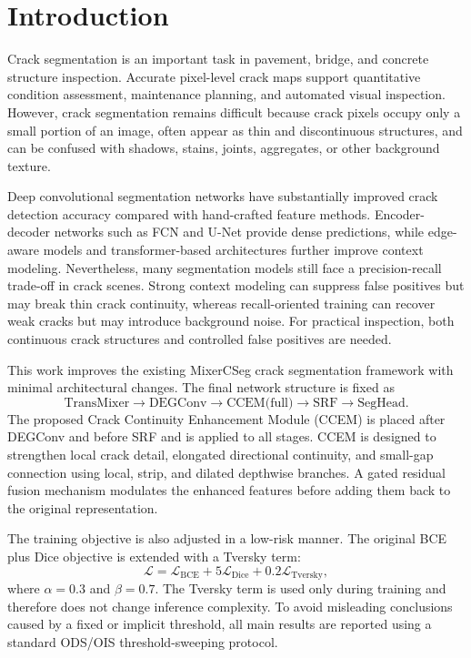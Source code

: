 \documentclass[preprint,12pt]{elsarticle}
\begin{document}
\section{Introduction}
\label{sec:introduction}

Crack segmentation is an important task in pavement, bridge, and concrete structure inspection. Accurate pixel-level crack maps support quantitative condition assessment, maintenance planning, and automated visual inspection. However, crack segmentation remains difficult because crack pixels occupy only a small portion of an image, often appear as thin and discontinuous structures, and can be confused with shadows, stains, joints, aggregates, or other background texture.

Deep convolutional segmentation networks have substantially improved crack detection accuracy compared with hand-crafted feature methods. Encoder-decoder networks such as FCN and U-Net provide dense predictions, while edge-aware models and transformer-based architectures further improve context modeling. Nevertheless, many segmentation models still face a precision-recall trade-off in crack scenes. Strong context modeling can suppress false positives but may break thin crack continuity, whereas recall-oriented training can recover weak cracks but may introduce background noise. For practical inspection, both continuous crack structures and controlled false positives are needed.

This work improves the existing MixerCSeg crack segmentation framework with minimal architectural changes. The final network structure is fixed as
\[
\text{TransMixer} \rightarrow \text{DEGConv} \rightarrow \text{CCEM(full)} \rightarrow \text{SRF} \rightarrow \text{SegHead}.
\]
The proposed Crack Continuity Enhancement Module (CCEM) is placed after DEGConv and before SRF and is applied to all stages. CCEM is designed to strengthen local crack detail, elongated directional continuity, and small-gap connection using local, strip, and dilated depthwise branches. A gated residual fusion mechanism modulates the enhanced features before adding them back to the original representation.

The training objective is also adjusted in a low-risk manner. The original BCE plus Dice objective is extended with a Tversky term:
\[
\mathcal{L} = \mathcal{L}_{\mathrm{BCE}} + 5\mathcal{L}_{\mathrm{Dice}} + 0.2\mathcal{L}_{\mathrm{Tversky}},
\]
where $\alpha=0.3$ and $\beta=0.7$. The Tversky term is used only during training and therefore does not change inference complexity. To avoid misleading conclusions caused by a fixed or implicit threshold, all main results are reported using a standard ODS/OIS threshold-sweeping protocol.
\end{document}
